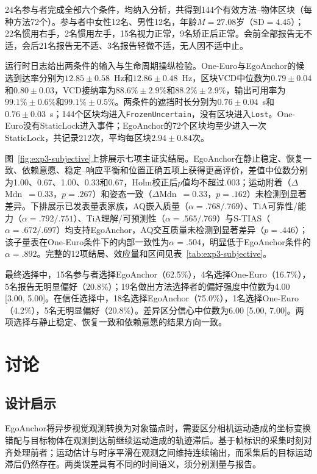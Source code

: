 \documentclass[review]{vgtc}
\begin{document}
24名参与者完成全部六个条件，均纳入分析，共得到144个有效方法--物体区块（每种方法72个）。参与者中女性12名、男性12名，年龄$M=27.08$岁（$\mathrm{SD}=4.45$）；22名惯用右手，2名惯用左手，15名视力正常，9名矫正后正常。会前全部报告无不适，会后21名报告无不适、3名报告轻微不适，无人因不适中止。

运行时日志给出两条件的输入与生命周期操纵检验。One-Euro与EgoAnchor的候选到达率分别为$12.85\pm0.58$~Hz和$12.86\pm0.48$~Hz，区块VCD中位数为$0.79\pm0.04$和$0.80\pm0.03$，VCD接纳率为$88.6\%\pm2.9\%$和$88.2\%\pm2.9\%$，输出可用率为$99.1\%\pm0.6\%$和$99.1\%\pm0.5\%$。两条件的遮挡时长分别为$0.76\pm0.04$~s和$0.76\pm0.03$~s；144个区块均进入\texttt{FrozenUncertain}，没有区块进入\texttt{Lost}。One-Euro没有StaticLock进入事件；EgoAnchor的72个区块均至少进入一次StaticLock，共记录212次，平均每区块$2.94\pm0.84$次。

图~\ref{fig:exp3-subjective}上排展示七项主证实结局。EgoAnchor在静止稳定、恢复一致、依赖意愿、稳定--响应平衡和位置正确五项上获得更高评价，差值中位数分别为1.00、0.67、1.00、0.33和0.67，Holm校正后$p$值均不超过.003；运动附着（$\Delta$Mdn~$=0.33$，$p=.267$）和姿态一致（$\Delta$Mdn~$=0.33$，$p=.162$）未检测到显著差异。下排展示已发表量表家族，AQ嵌入质量（$\alpha = .768/.769$）、TiA可靠性/能力（$\alpha = .792/.751$）、TiA理解/可预测性（$\alpha = .565/.769$）与S-TIAS（$\alpha = .672/.697$）均支持EgoAnchor，AQ交互质量未检测到显著差异（$p=.446$）；该子量表在One-Euro条件下的内部一致性为$\alpha = .504$，明显低于EgoAnchor条件的$\alpha = .892$。完整的12项结局、效应量和区间见表~\ref{tab:exp3-subjective}。

最终选择中，15名参与者选择EgoAnchor（62.5\%），4名选择One-Euro（16.7\%），5名报告无明显偏好（20.8\%）；19名做出方法选择者的偏好强度中位数为4.00 [3.00, 5.00]。在信任选择中，18名选择EgoAnchor（75.0\%），1名选择One-Euro（4.2\%），5名无明显偏好（20.8\%）。差异区分信心中位数为6.00 [5.00, 7.00]。两项选择与静止稳定、恢复一致和依赖意愿的结果方向一致。



\section{讨论}\label{sec:discussion}

\subsection{设计启示}

EgoAnchor将异步视觉观测转换为对象锚点时，需要区分相机运动造成的坐标变换错配与目标物体在观测到达前继续运动造成的轨迹滞后。基于帧标识的采集时刻对齐处理前者；运动估计与时序平滑在观测之间维持连续输出，而采集后的目标运动滞后仍然存在。两类误差具有不同的时间语义，须分别测量与报告。
\end{document}
